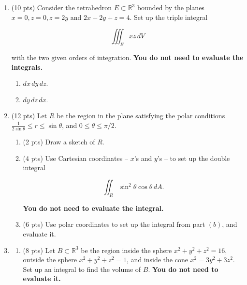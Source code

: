 \documentclass[12 pt]{report}
\begin{document}
\newpage
\begin{enumerate}

\item (10 pts) Consider the tetrahedron $E \subset \mathbb{R}^3$ bounded by the planes $x = 0, z = 0, z = 2y$ and $2x + 2y + z = 4$. Set up the triple integral 

\[
\iiint_E xz \, dV
\]

with the two given orders of integration. \textbf{You do not need to evaluate the integrals.}

\begin{enumerate} \item $dx \,dy \,dz.$
\vfill


\item $dy \, dz \, dx.$
\vfill
\end{enumerate}



\newpage

\item (12 pts) Let $R$ be the region in the plane satisfying the polar conditions $\frac{1}{2 \sin \theta} \leq r \leq \sin \theta$, and $0 \leq \theta \leq \pi/2$. 

\begin{enumerate} \item (2 pts) Draw a sketch of $R$.

\vfill

\item (4 pts) Use Cartesian coordinates -- $x$'s and $y$'s -- to set up the double integral

\[
\iint_R \sin^2 \theta \cos \theta \, dA.
\]

\textbf{You do not need to evaluate the integral.}

\vfill 

\newpage

\item (6 pts) Use polar coordinates to set up the integral from part $(b)$, and evaluate it. 

\end{enumerate}

\newpage

\item \begin{enumerate} \item (8 pts) Let $B \subset \mathbb{R}^3$ be the region inside the sphere $x^2 + y^2 + z^2 = 16$, outside the sphere $x^2 + y^2 + z^2 = 1$, and inside the cone $x^2 = 3y^2 + 3z^2$. Set up an integral to find the volume of $B$. \textbf{You do not need to evaluate it.}


\end{enumerate}
\end{enumerate}
\end{document}
